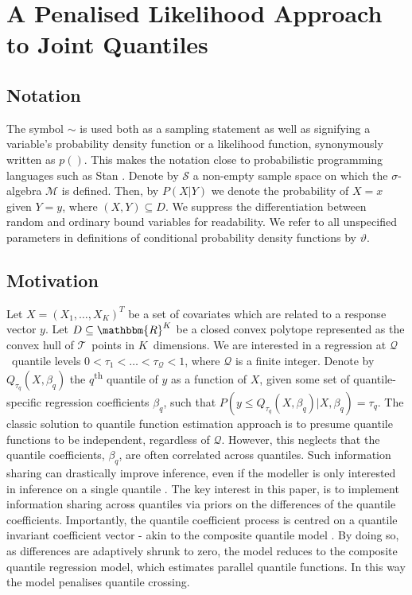 \section{A Penalised Likelihood Approach to Joint Quantiles}\label{sec:obj_to_joint_estim}
%
\subsection{Notation}
%
The symbol $\sim$ is used both as a sampling statement as well as signifying a variable's probability density function or a likelihood function, synonymously written as $p\left(\right)$. This makes the notation close to probabilistic programming languages such as Stan \citep{carpenter_stan_2017}. Denote by $\mathcal{S}$ a non-empty sample space on which the $\sigma$-algebra $\mathcal{M}$ is defined. Then, by $P\left(X|Y\right)$ we denote the probability of $X=x$ given $Y=y$, where $(X,Y) \subseteq D$. We suppress the differentiation between random and ordinary bound variables for readability. We refer to all unspecified parameters in definitions of conditional probability density functions by $\vartheta$. 
%
\subsection{Motivation}\label{sec:motivation}
%
Let $X = (X_1,\dotsc,X_K)^T$ be a set of covariates which are related to a response vector $y$. Let $D \subseteq \mathbbm{R}^K$ be a closed convex polytope represented as the convex hull of $\mathcal{T}$~points in $K$~dimensions. We are interested in a regression at $\mathcal{Q}$~quantile levels $0<\tau_1<\dotsc<\tau_{\mathcal{Q}}<1$, where $\mathcal{Q}$ is a finite integer. Denote by $Q_{\tau_q}(X,\beta_q)$ the $q$\textsuperscript{th} quantile of $y$ as a function of $X$, given some set of quantile-specific regression coefficients $\beta_q$, such that $P\left(y\leq Q_{\tau_q}(X,\beta_q) \vert X, \beta_q \right) = \tau_q$. The classic solution to quantile function estimation approach is to presume quantile functions to be independent, regardless of $\mathcal{Q}$. However, this neglects that the quantile coefficients, $\beta_q$, are often correlated across  quantiles. Such information sharing can drastically improve inference, even if the modeller is only interested in inference on a single quantile \citep{bondell2010noncrossing,jiang2013interquantile}. The key interest in this paper, is to implement information sharing across  quantiles via priors on the differences of the quantile coefficients. Importantly, the quantile coefficient process is centred on a quantile invariant coefficient vector - akin to the composite quantile model \citep{zou2008composite}. By doing so, as differences are adaptively shrunk to zero, the model reduces to the composite quantile regression model, which estimates parallel quantile functions. In this way the model penalises quantile crossing.
%

